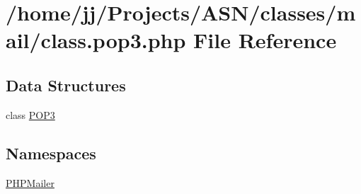 \hypertarget{class_8pop3_8php}{}\section{/home/jj/\+Projects/\+A\+S\+N/classes/mail/class.pop3.\+php File Reference}
\label{class_8pop3_8php}
\subsection*{Data Structures}
\begin{DoxyCompactItemize}
\item 
class \hyperlink{class_p_o_p3}{P\+O\+P3}
\end{DoxyCompactItemize}
\subsection*{Namespaces}
\begin{DoxyCompactItemize}
\item 
 \hyperlink{namespace_p_h_p_mailer}{P\+H\+P\+Mailer}
\end{DoxyCompactItemize}
